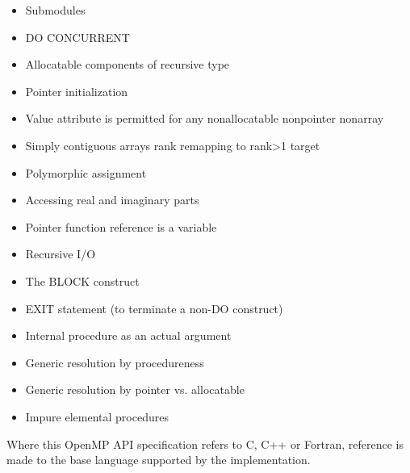 \begin{itemize}
\begin{itemize}
\item Submodules
\item DO CONCURRENT
\item Allocatable components of recursive type
\item Pointer initialization
\item Value attribute is permitted for any nonallocatable nonpointer nonarray
\item Simply contiguous arrays rank remapping to rank>1 target
\item Polymorphic assignment
\item Accessing real and imaginary parts
\item Pointer function reference is a variable
\item Recursive I/O
\item The BLOCK construct
\item EXIT statement (to terminate a non-DO construct)
\item Internal procedure as an actual argument
\item Generic resolution by procedureness
\item Generic resolution by pointer vs. allocatable
\item Impure elemental procedures
\end{itemize}

\end{itemize}

Where this OpenMP API specification refers to C, C++ or Fortran, reference is made to
the base language supported by the implementation.

